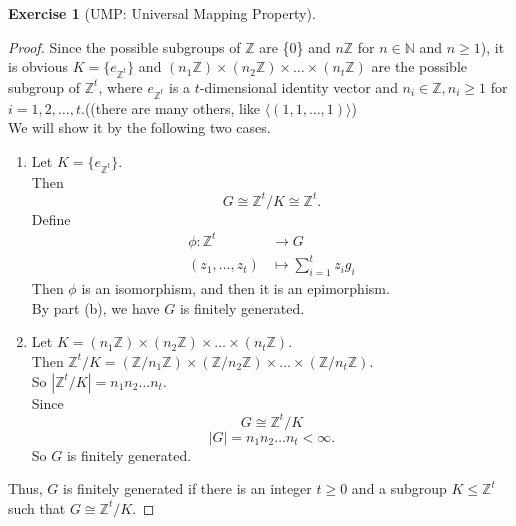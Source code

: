 \documentclass{article}
\newcommand{\bbz}{\mathbb{Z}}
\newcommand{\bbn}{\mathbb{N}}
\theoremstyle{plain}
\theoremstyle{definition}
\newtheorem{exer}[lem]{Exercise}
\begin{document}
\begin{exer}[UMP: Universal Mapping Property]
\begin{enumerate}[(a)]
\begin{enumerate}[(i)]
\begin{proof}
  	Since the possible subgroups of $\bbz$ are \{0\} and $n\bbz$ for $ n \in \bbn$ and $n \geq 1$),
  	it is obvious $K = \{e_{\bbz^t}\}$ and $(n_1\bbz)\times (n_2\bbz)\times \ldots \times (n_t\bbz)$ are the possible subgroup of $\bbz^t$, where $e_{\bbz^t}$ is a $t$-dimensional identity vector and $n_i \in \bbz, n_i\geq 1$ for $i=1,2,\ldots,t$.((there are many others, like $\langle (1,1,\ldots,1)\rangle$)\\
  	We will show it by the following two cases.
  	\begin{enumerate}[(1)]
  		\item
		Let $K=\{e_{\bbz^t}\}$.\\ 
		Then
		\[G \cong \bbz^t/K \cong \bbz^t.\]
		Define
  		\begin{align*}
			\phi: \bbz^t &\to G \\
  		  (z_1,\ldots,z_t) &\mapsto \sum_{i=1}^tz_ig_i 
  		\end{align*}
  		Then $\phi$ is an isomorphism, and then it is an epimorphism.\\
  		By part (b), we have $G$ is finitely generated.\\
		\item
		  Let $K = (n_1\bbz)\times (n_2\bbz)\times \ldots \times (n_t\bbz)$.\\
		  Then $\bbz^t / K = (\bbz/n_1\bbz) \times (\bbz/n_2\bbz)\times \ldots \times (\bbz/n_t\bbz)$.\\
		  So $\left| \bbz^t/K \right| =  n_1n_2 \ldots n_t$.\\
		  Since 
		  \[G \cong \bbz^t/K\]
			\[|G| = n_1n_2\ldots n_t < \infty.\]
		  So $G$ is finitely generated.
	\end{enumerate}
	Thus, $G$ is finitely generated if there is an integer $t\geq 0$ and a subgroup $K\leq\bbz^t$ such that $G\cong\bbz^t/K$.
\end{proof}



\end{enumerate}
\end{enumerate}
\end{exer}
\end{document}
